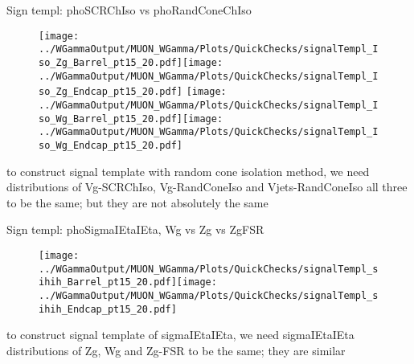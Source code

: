 \documentclass{beamer}
\begin{document}
\begin{frame}{Sign templ: phoSCRChIso vs phoRandConeChIso}
  \begin{figure}
    \centering
    \texttt{[image: ../WGammaOutput/MUON\_WGamma/Plots/QuickChecks/signalTempl\_Iso\_Zg\_Barrel\_pt15\_20.pdf]}\texttt{[image: ../WGammaOutput/MUON\_WGamma/Plots/QuickChecks/signalTempl\_Iso\_Zg\_Endcap\_pt15\_20.pdf]}
    \texttt{[image: ../WGammaOutput/MUON\_WGamma/Plots/QuickChecks/signalTempl\_Iso\_Wg\_Barrel\_pt15\_20.pdf]}\texttt{[image: ../WGammaOutput/MUON\_WGamma/Plots/QuickChecks/signalTempl\_Iso\_Wg\_Endcap\_pt15\_20.pdf]}
  \end{figure}
  \scriptsize to construct signal template with random cone isolation method, we need distributions of Vg-SCRChIso, Vg-RandConeIso and Vjets-RandConeIso all three to be the same; but they are not absolutely the same
\end{frame}

\begin{frame}{Sign templ: phoSigmaIEtaIEta, Wg vs Zg vs ZgFSR}
  \begin{figure}
    \centering
    \texttt{[image: ../WGammaOutput/MUON\_WGamma/Plots/QuickChecks/signalTempl\_sihih\_Barrel\_pt15\_20.pdf]}\texttt{[image: ../WGammaOutput/MUON\_WGamma/Plots/QuickChecks/signalTempl\_sihih\_Endcap\_pt15\_20.pdf]}
  \end{figure}
  \scriptsize to construct signal template of sigmaIEtaIEta, we need sigmaIEtaIEta distributions of Zg, Wg and Zg-FSR to be the same; they are similar
\end{frame}
\end{document}
